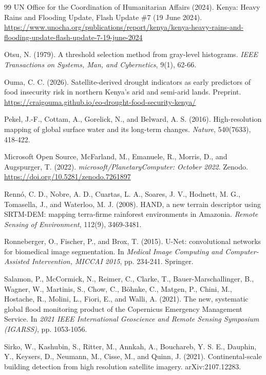 \documentclass[11pt]{article}
\begin{document}
\begin{thebibliography}{99}
UN Office for the Coordination of Humanitarian Affairs (2024). Kenya: Heavy
Rains and Flooding Update, Flash Update \#7 (19 June 2024).
\url{https://www.unocha.org/publications/report/kenya/kenya-heavy-rains-and-flooding-update-flash-update-7-19-june-2024}

Otsu, N. (1979). A threshold selection method from gray-level histograms.
\textit{IEEE Transactions on Systems, Man, and Cybernetics}, 9(1), 62-66.

Ouma, C. C. (2026). Satellite-derived drought indicators as early predictors of
food insecurity risk in northern Kenya's arid and semi-arid lands. Preprint.
\url{https://craigouma.github.io/eo-drought-food-security-kenya/}

Pekel, J.-F., Cottam, A., Gorelick, N., and Belward, A. S. (2016).
High-resolution mapping of global surface water and its long-term changes.
\textit{Nature}, 540(7633), 418-422.

Microsoft Open Source, McFarland, M., Emanuele, R., Morris, D., and
Augspurger, T. (2022). \textit{microsoft/PlanetaryComputer: October 2022}.
Zenodo. \url{https://doi.org/10.5281/zenodo.7261897}

Renn\'o, C. D., Nobre, A. D., Cuartas, L. A., Soares, J. V., Hodnett, M. G.,
Tomasella, J., and Waterloo, M. J. (2008). HAND, a new terrain descriptor using
SRTM-DEM: mapping terra-firme rainforest environments in Amazonia.
\textit{Remote Sensing of Environment}, 112(9), 3469-3481.

Ronneberger, O., Fischer, P., and Brox, T. (2015). U-Net: convolutional
networks for biomedical image segmentation. In \textit{Medical Image Computing
and Computer-Assisted Intervention, MICCAI 2015}, pp. 234-241. Springer.

Salamon, P., McCormick, N., Reimer, C., Clarke, T., Bauer-Marschallinger, B.,
Wagner, W., Martinis, S., Chow, C., B\"ohnke, C., Matgen, P., Chini, M.,
Hostache, R., Molini, L., Fiori, E., and Walli, A. (2021). The new, systematic
global flood monitoring product of the Copernicus Emergency Management
Service. In \textit{2021 IEEE International Geoscience and Remote Sensing
Symposium (IGARSS)}, pp. 1053-1056.

Sirko, W., Kashubin, S., Ritter, M., Annkah, A., Bouchareb, Y. S. E., Dauphin,
Y., Keysers, D., Neumann, M., Cisse, M., and Quinn, J. (2021).
Continental-scale building detection from high resolution satellite imagery.
arXiv:2107.12283.


\end{thebibliography}
\end{document}
